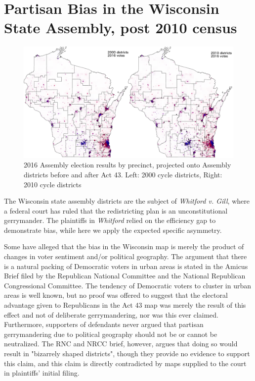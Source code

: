 \documentclass[preprint,12pt]{article}
\begin{document}
\section{Partisan Bias in the Wisconsin State Assembly, post 2010 census\label{sec:Wis}}

\begin{figure}[htb!]
    \begin{center}
        \includegraphics[scale=0.35]{../Figures/WI_compared/precincts_pop_combined.png}
        \caption{2016 Assembly election results by precinct, projected onto Assembly districts before and after Act 43. Left: 2000 cycle districts, Right: 2010 cycle districts}\label{fig:MapsWI}
    \end{center}
\end{figure}

The Wisconsin state assembly districts are the subject of \emph{Whitford v. Gill}, where a federal court has ruled that the redistricting plan is an unconstitutional gerrymander.
The plaintiffs in \emph{Whitford} relied on the efficiency gap to demonstrate bias, while here we apply the expected specific asymmetry.

Some have alleged that the bias in the Wisconsin map is merely the product of changes in voter sentiment and/or political geography.
The argument that there is a natural packing of Democratic voters in urban areas is stated in the Amicus Brief filed by the Republican National Committee and the National Republican Congressional Committee.
The tendency of Democratic voters to cluster in urban areas is well known, but no proof was offered to suggest that the electoral advantage given to Republicans in the Act 43 map was merely the result of this effect and not of deliberate gerrymandering, nor was this ever claimed.
Furthermore, supporters of defendants never argued that partisan gerrymandering due to political geography should not be or cannot be neutralized.
The RNC and NRCC brief, however, argues that doing so would result in "bizarrely shaped districts", though they provide no evidence to support this claim, and this claim is directly contradicted by maps supplied to the court in plaintiffs' initial filing.
\end{document}
